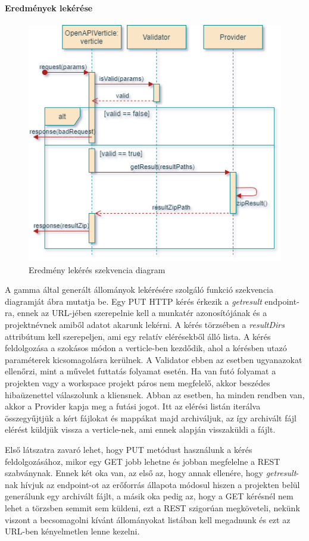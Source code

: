\paragraph{Eredmények lekérése}
\begin{figure}[!ht]
	\includegraphics[keepaspectratio]{figures/get_result_seq.png}
	\caption{Eredmény lekérés szekvencia diagram}
	\label{fig:getresult}
\end{figure}
A gamma által generált állományok lekérésére szolgáló funkció szekvencia diagramját  ábra mutatja be. Egy PUT HTTP kérés érkezik a \textit{getresult} endpoint-ra, ennek az URL-jében szerepelnie kell a munkatér azonosítójának és a projektnévnek amiből adatot akarunk lekérni. A kérés törzsében a \textit{resultDirs} attribútum kell szerepeljen, ami egy relatív elérésekből álló lista. A kérés feldolgozása a szokásos módon a verticle-ben kezdődik, ahol a kérésben utazó paraméterek kicsomagolásra kerülnek. A Validator ebben az esetben ugyanazokat ellenőrzi, mint a művelet futtatás folyamat esetén. Ha van futó folyamat a projekten vagy a workspace projekt páros nem megfelelő, akkor beszédes hibaüzenettel válaszolunk a kliensnek. Abban az esetben, ha minden rendben van, akkor a Provider kapja meg  a futási jogot. Itt az elérési listán iterálva összegyűjtjük a kért fájlokat és mappákat majd archiváljuk, az így archivált fájl elérést küldjük vissza a verticle-nek, ami ennek alapján visszaküldi a fájlt.

Első látszatra zavaró lehet, hogy PUT metódust használunk a kérés feldolgozásához, mikor egy GET jobb lehetne és jobban megfelelne a REST szabványnak. Ennek két oka van, az első az, hogy annak ellenére, hogy \textit{getresult}-nak hívjuk az endpoint-ot az erőforrás állapota módosul hiszen a projekten belül generálunk egy archivált fájlt, a másik oka pedig az, hogy a GET kérésnél nem lehet a törzsben semmit sem küldeni, ezt a REST szigorúan megköveteli, nekünk viszont a becsomagolni kívánt állományokat listában kell megadnunk és ezt az URL-ben kényelmetlen lenne kezelni.


